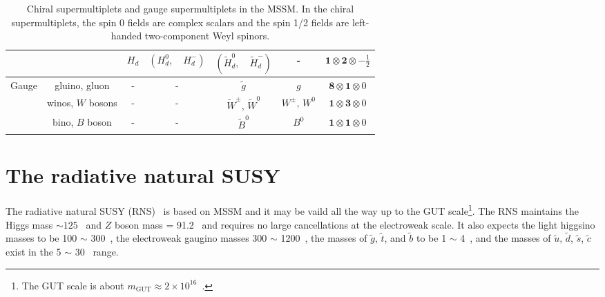 \begin{table}[htp]
{\begin{tabular}{ccccccc}
                                    &                                                            & $H_{d}$        & $(H^{0}_{d}, \quad H^{-}_{d})$                   & $(\widetilde{H}^{0}_{d}, \quad \widetilde{H}^{-}_{d})$ & -                  & $\mathbf{1} \otimes \mathbf{2} \otimes -\frac{1}{2}$\\
            \hline
            \hline
            \multirow{3}{*}{Gauge}  & gluino, gluon                                              & -              & -                                                & $\widetilde{g}$                                        & $g$                & $\mathbf{8} \otimes \mathbf{1} \otimes 0$\\
                                    & winos, $W$ bosons                                          & -              & -                                                & $\widetilde{W}^{\pm}$, $\widetilde{W}^{0}$             & $W^{\pm}$, $W^{0}$ & $\mathbf{1} \otimes \mathbf{3} \otimes 0$\\
                                    & bino, $B$ boson                                            & -              & -                                                & $\widetilde{B}^{0}$                                    & $B^{0}$            & $\mathbf{1} \otimes \mathbf{1} \otimes 0$\\
            \hline
            \hline
        \end{tabular}
    }
    \caption{Chiral supermultiplets and gauge supermultiplets in the MSSM.
    In the chiral supermultiplets, the spin 0 fields are complex scalars and the spin 1/2 fields are left-handed two-component Weyl spinors.}
    \label{tab:susy_particle_contents}
\end{table}%


\section{The radiative natural SUSY}
\label{sec:susy_rns}
The radiative natural SUSY (RNS)~\cite{Baer:2013xua, Baer:2012up, Baer:2012se, Baer:2012cf} is based on MSSM and it may be vaild all the way up to the GUT scale\footnote{The GUT scale is about $m_{\text{GUT}} \approx 2 \times 10^{16}$~{\GeV}.}.
The RNS maintains the Higgs mass \mH $\sim 125$~{\GeV} and $Z$ boson mass \mZ = 91.2~{\GeV} and requires no large cancellations at the electroweak scale.
It also expects the light higgsino masses to be 100 $\sim$ 300~{\GeV}, the electroweak gaugino masses 300 $\sim$ 1200~{\GeV}, the masses of $\tilde{g}$, $\tilde{t}$, and $\tilde{b}$ to be 1 $\sim$ 4~{\TeV}, and the masses of $\tilde{u}$, $\tilde{d}$, $\tilde{s}$, $\tilde{c}$ exist in the 5 $\sim$ 30~{\TeV} range.

